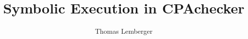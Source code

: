 \documentclass{acm_proc_article-sp}
\begin{document}
\sloppy
\title{Symbolic Execution in CPAchecker}
\subtitle{}
\author{
  \alignauthor
  Thomas Lemberger
}
\maketitle

%







\end{document}
